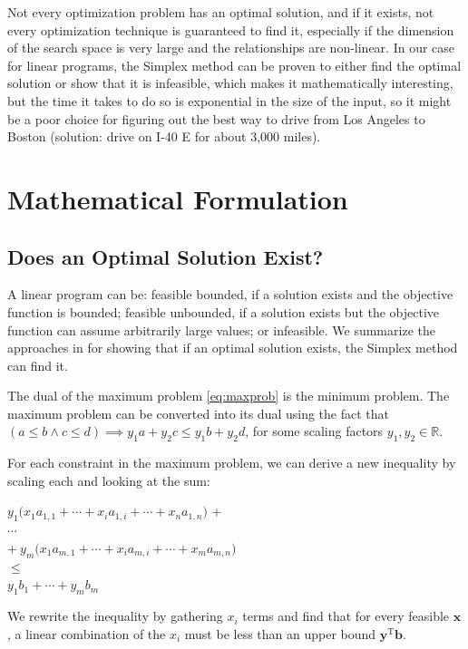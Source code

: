 \documentclass[12pt]{article}
\begin{document}
Not every optimization problem has an optimal solution, and if it exists, not every optimization technique is guaranteed to find it, especially if the dimension of the search space is very large and the relationships are non-linear. In our case for linear programs, the Simplex method can be proven to either find the optimal solution or show that it is infeasible, which makes it mathematically interesting, but the time it takes to do so is exponential in the size of the input, so it might be a poor choice for figuring out the best way to drive from Los Angeles to Boston (solution: drive on I-40 E for about 3,000 miles). 

\section{Mathematical Formulation}
\subsection{Does an Optimal Solution Exist?}
A linear program can be: feasible bounded, if a solution exists and the objective function is bounded; feasible unbounded, if a solution exists but the objective function can assume arbitrarily large values; or infeasible. We summarize the approaches in \cite{ferguson, trevisan} for showing that if an optimal solution exists, the Simplex method can find it.

The dual of the maximum problem \eqref{eq:maxprob} is the minimum problem. The maximum problem can be converted into its dual using the fact that $(a \leq b \land c \leq d) \implies y_1a+y_2c \leq y_1b+y_2d$, for some scaling factors $y_1, y_2 \in \mathbb{R}$. 

For each constraint in the maximum problem, we can derive a new inequality by scaling each and looking at the sum:

\begin{center}
    $y_1\big(x_1a_{1,1} +  \cdots + x_ia_{1,i} + \cdots +  x_na_{1,n}\big)$ + \\
    $\cdots$ \\
    $+ \ y_m\big( x_1a_{m,1} + \cdots + x_ia_{m,i} + \cdots +  x_ma_{m,n} \big) $\\
    $ \leq$ \\
    $ y_1b_1  + \cdots +  y_mb_m$ 
\end{center} 

We rewrite the inequality by gathering $x_i$ terms and find that for every feasible $\mathbf{x}$, a linear combination of the $x_i$ must be less than an upper bound $\mathbf{y}^\text{T}\mathbf{b}$.
\end{document}
